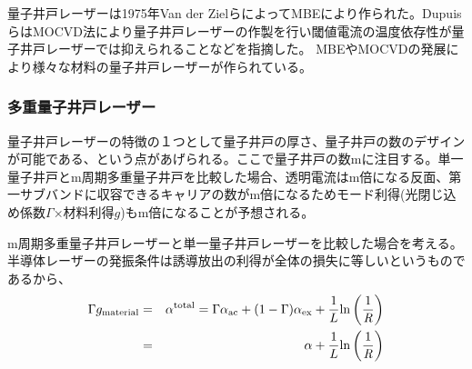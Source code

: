 量子井戸レーザーは1975年Van der ZielらによってMBEにより作られた\cite{ref_van}。DupuisらはMOCVD法により量子井戸レーザーの作製を行い閾値電流の温度依存性が量子井戸レーザーでは抑えられることなどを指摘した\cite{ref_dupuis}。%
MBEやMOCVDの発展により様々な材料の量子井戸レーザーが作られている。
\subsubsection{多重量子井戸レーザー}
量子井戸レーザーの特徴の１つとして量子井戸の厚さ、量子井戸の数のデザインが可能である、という点があげられる。ここで量子井戸の数mに注目する。単一量子井戸とm周期多重量子井戸を比較した場合、透明電流はm倍になる反面、第一サブバンドに収容できるキャリアの数がm倍になるためモード利得(光閉じ込め係数$\Gamma$×材料利得$g$)もm倍になることが予想される。

m周期多重量子井戸レーザーと単一量子井戸レーザーを比較した場合を考える。
半導体レーザーの発振条件は誘導放出の利得が全体の損失に等しいというものであるから、
\begin{eqnarray}
\label{eq:th}
\Gamma g_{\rm{material}}&=&\alpha^{\rm{total}}= \Gamma \alpha_{\rm{ac}} +(1-\Gamma)\alpha_{\rm{ex}}+\dfrac{1}{L}\rm{ln}\left( \dfrac{1}{\it R} \right )\\
&=& \alpha + \dfrac{1}{L}\rm{ln}\left( \dfrac{1}{\it R} \right )
\end{eqnarray}

